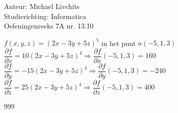 \documentclass[a4paper]{article}
\begin{document}
  
\noindent \large Auteur: Michael Livchits \\
\noindent \large Studierichting: Informatica\\
\noindent \large Oefeningenreeks 7A nr. 13.10\\

\medskip

\normalsize

$f(x,y,z) = (2x-3y+5z)^5$ in het punt $a\left(-5,1,3\right)$\\

$\dfrac{\partial f}{\partial x} = 10(2x-3y+5z)^4 \Rightarrow\dfrac{\partial f}{\partial x}(-5,1,3) = 160$\\

$\dfrac{\partial f}{\partial y} = -15(2x-3y+5z)^4 \Rightarrow\dfrac{\partial f}{\partial y}(-5,1,3) = -240$\\

$\dfrac{\partial f}{\partial z} = 25(2x-3y+5z)^4 \Rightarrow\dfrac{\partial f}{\partial z}(-5,1,3) = 400$\\

\begin{thebibliography}{999}
\end{thebibliography}
\end{document}
